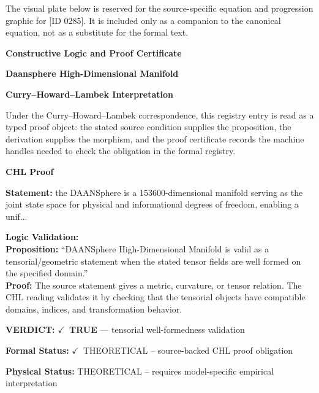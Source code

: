 \begingroup\footnotesize\sloppy
The visual plate below is reserved for the source-specific equation and progression graphic for [ID 0285]. It is included only as a companion to the canonical equation, not as a substitute for the formal text.
\par\endgroup
\ifTZPDarkEdition
{}
\fi

\clearpage
\begingroup\tzpsupportsetup
\noindent\textbf{\fontsize{10.8pt}{12.8pt}\selectfont [ID 0285] Constructive Logic and Proof Certificate}\par
\noindent\textbf{\fontsize{10pt}{12pt}\selectfont Daansphere High-Dimensional Manifold}\par
\vspace{0.45em}
\begingroup
\footnotesize
\setlength{\parskip}{0.22em}
\setlength{\parindent}{0pt}
\noindent\textbf{Curry--Howard--Lambek Interpretation}\par
Under the Curry--Howard--Lambek correspondence, this registry entry is read as a typed proof
object: the stated source condition supplies the proposition, the derivation supplies the
morphism, and the proof certificate records the machine handles needed to check the obligation
in the formal registry.

\vspace{0.45em}
\noindent\textbf{CHL Proof}\par
\textbf{Statement:} the DAANSphere is a 153600-dimensional manifold serving as the joint state space for
physical and informational degrees of freedom, enabling a unif...

\textbf{Logic Validation:}\\
\textbf{Proposition:} ``DAANSphere High-Dimensional Manifold is valid as a tensorial/geometric statement when
the stated tensor fields are well formed on the specified domain.''\\
\textbf{Proof:} The source statement gives a metric, curvature, or tensor relation. The CHL reading
validates it by checking that the tensorial objects have compatible domains, indices,
and transformation behavior.

\textbf{VERDICT:} \ensuremath{\checkmark}\ \textbf{TRUE} --- tensorial well-formedness validation

\textbf{Formal Status:} \ensuremath{\checkmark}\ THEORETICAL -- source-backed CHL proof obligation

\textbf{Physical Status:} THEORETICAL -- requires model-specific empirical interpretation
\par\vspace{0.45em}
\par
\ifTZPDarkEdition
{}
\fi
\endgroup
\endgroup

